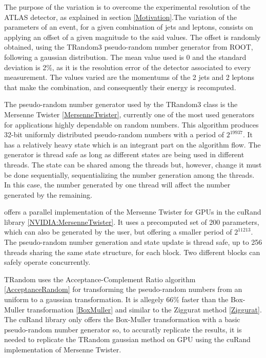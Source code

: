 The purpose of the variation is to overcome the experimental resolution of the ATLAS detector, as explained in section \ref{Motivation}.The variation of the parameters of an event, for a given combination of jets and leptons, consists on applying an offset of a given magnitude to the said values. The offset is randomly obtained, using the TRandom3 pseudo-random number generator from ROOT, following a gaussian distribution. The mean value used is 0 and the standard deviation is 2\%, as it is the resolution error of the detector associated to every measurement. The values varied are the momentums of the 2 jets and 2 leptons that make the combination, and consequently their energy is recomputed.

The pseudo-random number generator used by the TRandom3 class is the Mersenne Twister \ref{MersenneTwister}, currently one of the most used generators for applications highly dependable on random numbers. This algorithm produces 32-bit uniformly distributed pseudo-random numbers with a period of $2^{19937}$. It has a relatively heavy state which is an integrant part on the algorithm flow. The generator is thread safe as long as different states are being used in different threads. The state can be shared among the threads but, however, change it must be done sequentially, sequentializing the number generation among the threads. In this case, the number generated by one thread will affect the number generated by the remaining.

\nvidia offers a parallel implementation of the Mersenne Twister for GPUs in the cuRand library \ref{NVIDIA:MersenneTwister}. It uses a precomputed set of 200 parameters, which can also be generated by the user, but offering a smaller period of $2^{11213}$. The pseudo-random number generation and state update is thread safe, up to 256 threads sharing the same state structure, for each block. Two different blocks can safely operate concurrently.

TRandom uses the Acceptance-Complement Ratio algorithm \ref{AcceptanceRandom} for transforming the pseudo-random numbers from an uniform to a gaussian transformation. It is allegely 66\% faster than the Box-Muller transformation \ref{BoxMuller} and similar to the Ziggurat method \ref{Ziggurat}. The cuRand library only offers the Box-Muller transformation with a basic pseudo-random number generator so, to accuratly replicate the results, it is needed to replicate the TRandom gaussian method on GPU using the cuRand implementation of Mersenne Twister.

